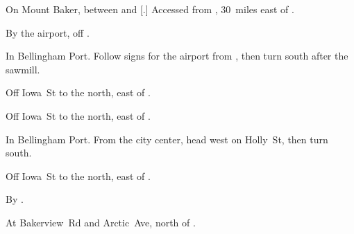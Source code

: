 
\begin{LocationList}

On Mount Baker,
between  and [.]
Accessed from , 30~miles east of .

By the airport, off  .

In Bellingham Port.
Follow signs for the airport from  , then turn south after the sawmill.

Off Iowa~St to the north, east of  .

\Location{\RecruitmentAgency \Recruitment}
Off Iowa~St to the north, east of  .

In Bellingham Port.
From the city center, head west on Holly~St, then turn south.

Off Iowa~St to the north, east of  .

\Location{\TruckStop \Gas \Rest}
By  .

At Bakerview~Rd and Arctic~Ave, north of  .

\end{LocationList}
